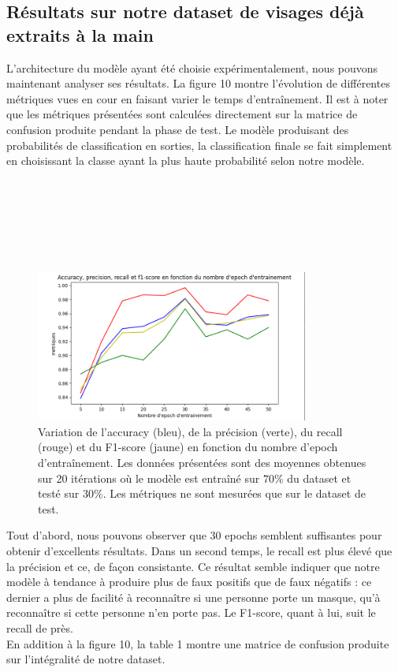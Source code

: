 \documentclass{article}
\begin{document}
\subsection{Résultats sur notre dataset de visages déjà extraits à la main}
L'architecture du modèle ayant été choisie expérimentalement, nous pouvons maintenant analyser ses résultats. La figure 10 montre l'évolution de différentes métriques vues en cour en faisant varier le temps d'entraînement. Il est à noter que les métriques présentées sont calculées directement sur la matrice de confusion produite pendant la phase de test. Le modèle produisant des probabilités de classification en sorties, la classification finale se fait simplement en choisissant la classe ayant la plus haute probabilité selon notre modèle.\\\\\\\\\\\\\\
\begin{figure}[h]
\centering
\includegraphics[width=0.8\textwidth]{metrics_epoch.png}
\caption{\label{fig:Input}Variation de l'accuracy (bleu), de la précision (verte), du recall (rouge) et du F1-score (jaune) en fonction du nombre d'epoch d'entraînement. Les données présentées sont des moyennes obtenues sur 20 itérations où le modèle est entraîné sur $70\%$ du dataset et testé sur $30\%$. Les métriques ne sont mesurées que sur le dataset de test.}
\end{figure}

Tout d'abord, nous pouvons observer que 30 epochs semblent suffisantes pour obtenir d'excellents résultats. Dans un second temps, le recall est plus élevé que la précision et ce, de façon consistante. Ce résultat semble indiquer que notre modèle à tendance à produire plus de faux positifs que de faux négatifs : ce dernier a plus de facilité à reconnaître si une personne porte un masque, qu'à reconnaître si cette personne n'en porte pas. Le F1-score, quant à lui, suit le recall de près.\\
En addition à la figure 10, la table 1 montre une matrice de confusion produite sur l'intégralité de notre dataset. \\
\end{document}

